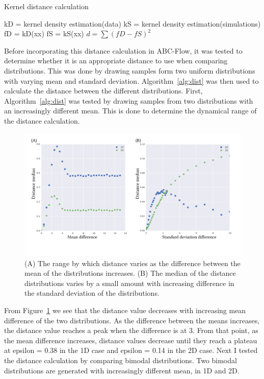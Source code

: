 \begin{algorithm}[tb]
\caption{Kernel distance calculation}
\label{alg:dist}
 \begin{algorithmic}[1]
    \Statex
	\State kD = kernel density estimation(data)
	\State kS = kernel density estimation(simulations)
	\State fD = kD(xx)
	\State fS = kS(xx)    
	\State $d = \sum(fD-fS)^2$
  \end{algorithmic}
\end{algorithm}

Before incorporating this distance calculation in ABC-Flow, it was tested to determine whether it is an appropriate distance to use when comparing distributions. This was done by drawing samples form two uniform distributions with varying mean and standard deviation. Algorithm~\ref{alg:dist} was then used to calculate the distance between the different distributions. First, Algorithm~\ref{alg:dist} was tested by drawing samples from two distributions with an increasingly different mean. This is done to determine the dynamical range of the distance calculation.

\begin{figure}[htb]
\centering
\includegraphics[scale=0.7]{../../chapters/chapterABCFlow/images/mus_sigmas-01.png}
\caption[Range of distance values using the kernel distance]{\label{fig:epsilon_mu_s_diff}(A) The range by which distance varies as the difference between the mean of the distributions increases. (B) The median of the distance distributions varies by a small amount with increasing difference in the standard deviation of the distributions.}
\end{figure}

From Figure~\ref{fig:epsilon_mu_s_diff} we see that the distance value decreases with increasing mean difference of the two distributions. As the difference between the means increases, the distance value reaches a peak when the difference is at 3. From that point, as the mean difference increases, distance values decrease until they reach a plateau at epsilon = 0.38 in the 1D case and epsilon = 0.14 in the 2D case. Next I tested the distance calculation by comparing bimodal distributions. Two bimodal distributions are generated with increasingly different mean, in 1D and 2D. 


